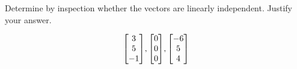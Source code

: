 \documentclass{../mathhomework}
\newenvironment{Mat}{\begin{bmatrix}}{\end{bmatrix}}
\begin{document}
\begin{problem}[1.7\#17]
    Determine by inspection whether the vectors are linearly independent. Justify your answer.

    \begin{equation*}
        \begin{Mat}
            3 \\ 5 \\ -1
        \end{Mat},
        \begin{Mat}
            0 \\ 0 \\ 0
        \end{Mat},
        \begin{Mat}
            -6 \\ 5 \\ 4
        \end{Mat}
    \end{equation*}


\end{problem}
\end{document}
